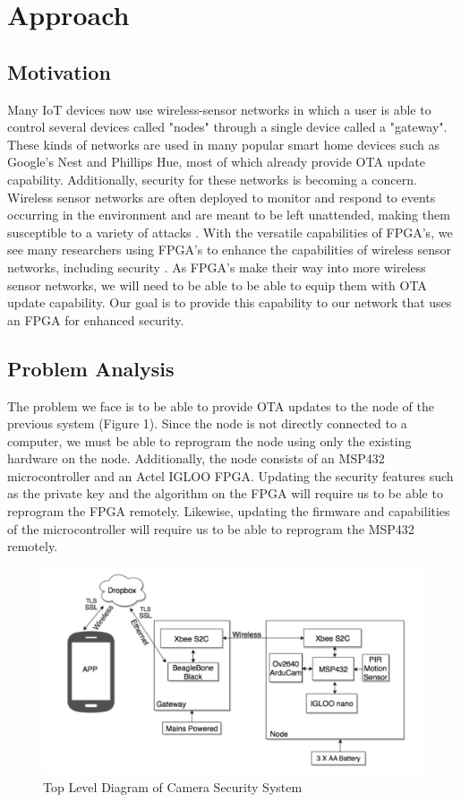 \documentclass[11pt]{article}
\begin{document}
\section{Approach}
\subsection{Motivation}

Many IoT devices now use wireless-sensor networks in which a user is able to control several devices called "nodes" through a single device called a "gateway". These kinds of networks are used in many popular smart home devices such as Google's Nest and Phillips Hue, most of which already provide OTA update capability. Additionally, security for these networks is becoming a concern. Wireless sensor networks are often deployed to monitor and respond to events occurring in the environment and are meant to be left unattended, making them susceptible to a variety of attacks \cite{sen_security_2013}. With the versatile capabilities of FPGA's, we see many researchers using FPGA's to enhance the capabilities of wireless sensor networks, including security \cite{g_elliptic_2016}. As FPGA's make their way into more wireless sensor networks, we will need to be able to be able to equip them with OTA update capability. Our goal is to provide this capability to our network that uses an FPGA for enhanced security. 


\subsection{Problem Analysis}
The problem we face is to be able to provide OTA updates to the node of the previous system (Figure 1). Since the node is not directly connected to a computer, we must be able to reprogram the node using only the existing hardware on the node. Additionally, the node consists of an MSP432 microcontroller and an Actel IGLOO FPGA. Updating the security features such as the private key and the algorithm on the FPGA will require us to be able to reprogram the FPGA remotely. Likewise, updating the firmware and capabilities of the microcontroller will require us to be able to reprogram the MSP432 remotely. 

\begin{figure}[!ht]
\centering
\includegraphics[scale = 0.35]{schematic1.png}
\caption{Top Level Diagram of Camera Security System}
\end{figure}
\FloatBarrier
\end{document}
